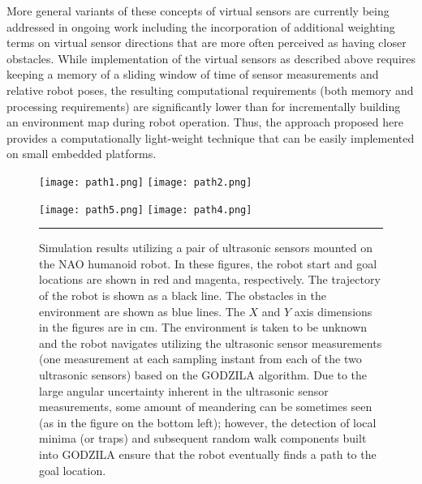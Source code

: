 \documentclass[10pt,conference]{ieeeconf}
\begin{document}
More general variants of these concepts of virtual sensors are currently being
addressed in ongoing work including the incorporation of additional weighting terms on
virtual sensor directions that are more often perceived as having closer
obstacles. While implementation of the virtual sensors as described above requires keeping a
memory of a sliding window of time of sensor measurements and relative robot
poses, the resulting computational requirements (both memory and processing
requirements) are significantly lower than for incrementally building an
environment map during robot operation.  Thus, the approach proposed here provides a
computationally light-weight technique that can be easily implemented on small
embedded platforms.

\begin{figure*}[htb]
          \centerline{\texttt{[image: path1.png]}
        \texttt{[image: path2.png]}} 
	\centerline{\texttt{[image: path5.png]}
        \texttt{[image: path4.png]}} 

    \caption{Simulation results utilizing a pair of ultrasonic sensors mounted
    on the NAO humanoid robot. In these figures, the robot start and goal
  locations are shown in red and magenta, respectively. The trajectory of the
robot is shown as a black line. The obstacles in the environment are shown as
blue lines. The $X$ and $Y$ axis dimensions in the figures are in cm. The
environment is taken to be unknown and the robot navigates utilizing the
ultrasonic sensor measurements (one measurement at each sampling instant from
each of the two ultrasonic sensors) based on the GODZILA algorithm. Due to the
large angular uncertainty inherent in the ultrasonic sensor measurements, some
amount of meandering can be sometimes seen (as in the figure on the bottom
left); however, the detection of local minima (or traps) and subsequent random
walk components built into GODZILA ensure that the robot eventually finds a
path to the goal location.}
    \label{fig:simfig1}
	\hrule
        \vspace*{-0.3in}
\end{figure*}
\end{document}

